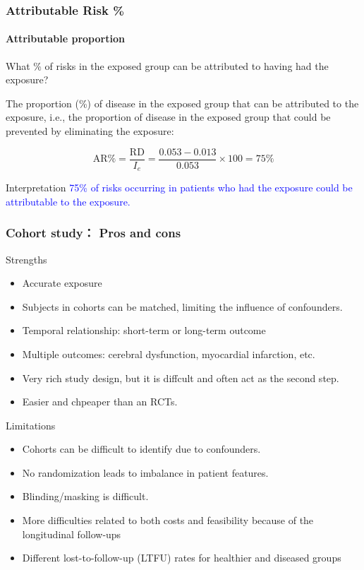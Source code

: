 \documentclass[table,10pt]{beamer}
\begin{document}
\begin{CJK*}{UTF8}{gbsn}
\begin{frame}[t]
\frametitle{Attributable Risk \%}
\framesubtitle{Attributable proportion}
\alert{\large{What \% of risks in the exposed group
can be attributed to having had the exposure?}}

The proportion (\%) of disease in the exposed group
that can be attributed to the exposure, i.e., the
proportion of disease in the exposed group that
could be prevented by eliminating the exposure:

$$
\textrm{AR}\% = \frac{\textrm{RD}}{I_e} = \frac{0.053-0.013}{0.053}\times 100 = 75\% 
$$

\begin{alertblock}{\center Interpretation} 
\textcolor{blue}{\large 75\% of risks occurring in patients who had the exposure could be 
attributable to the exposure.}
\end{alertblock}
\end{frame}

\begin{frame}[t]
\frametitle{Cohort study： Pros and cons}
\begin{block}{Strengths}
\begin{itemize}
	\item Accurate exposure
	\item Subjects in cohorts can be matched, limiting the influence of confounders.
	\item Temporal relationship: short-term or long-term outcome
	\item Multiple outcomes: cerebral dysfunction, myocardial infarction, etc.
	\item Very rich study design, but it is diffcult and often act as the second step.
	\item Easier and chpeaper than an RCTs.
\end{itemize}
\end{block}
\begin{block}{Limitations}
\begin{itemize}
	\item Cohorts can be difficult to identify due to confounders.
	\item No randomization leads to imbalance in patient features.
	\item Blinding/masking is difficult.
	\item More difficulties related to both costs and feasibility because of the 
		longitudinal follow-ups
	\item Different lost-to-follow-up (LTFU) rates for healthier and diseased groups
\end{itemize}
\end{block}
\end{frame}



\end{CJK*}
\end{document}

